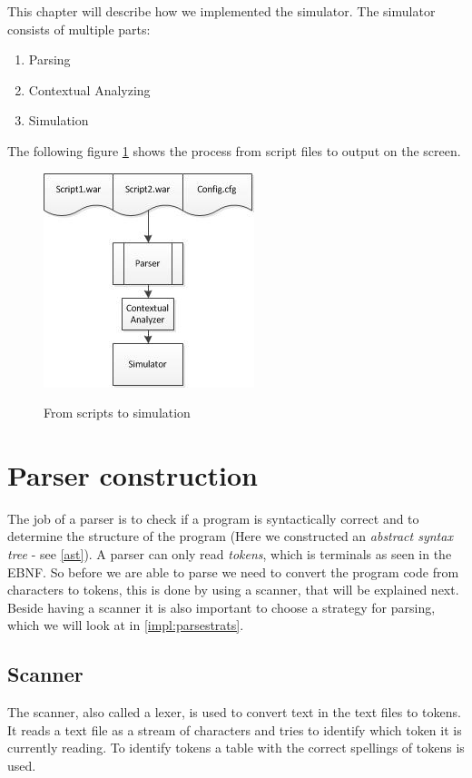 This chapter will describe how we implemented the simulator. The simulator consists of multiple parts: \\
\begin{enumerate}
	\item Parsing
	\item Contextual Analyzing
	\item Simulation
\end{enumerate}

The following figure \ref{fig:script_to_simu} shows the process from script files to output on the screen.

\begin{figure}[H]
\centering
\includegraphics[scale=1.2]{rapport/6/figures/script_to_simu}
\label{fig:script_to_simu}
\caption{From scripts to simulation}
\end{figure}

\section{Parser construction}
	The job of a parser is to check if a program is syntactically correct and 
	to determine the structure of the program (Here we constructed an {\it abstract syntax tree} - see \ref{ast}).
	A parser can only read {\it tokens}, which is terminals as seen in the EBNF. So before we are able to parse we need to convert 
	the program code from characters to tokens, this is done by using a scanner, that will be explained next. Beside having a scanner it is 
	also important to choose a strategy for parsing, which we will look at in \ref{impl:parsestrats}.
	
	\subsection{Scanner}
		The scanner, also called a lexer, is used to convert text in the text files to tokens. 
		It reads a text file as a stream of characters and tries to identify which token it is currently reading.
		To identify tokens a table with the correct spellings of tokens is used.			 
		
